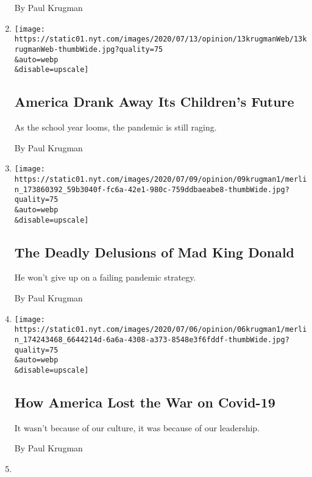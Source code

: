 \begin{enumerate}
  By Paul Krugman
\item
  \href{/2020/07/13/opinion/coronavirus-schools-bars.html}{}

  \texttt{[image: https://static01.nyt.com/images/2020/07/13/opinion/13krugmanWeb/13krugmanWeb-thumbWide.jpg?quality=75\\\&auto=webp\\\&disable=upscale]}

  \hypertarget{america-drank-away-its-childrens-future}{%
  \subsection{America Drank Away Its Children's
  Future}\label{america-drank-away-its-childrens-future}}

  As the school year looms, the pandemic is still raging.

  By Paul Krugman
\item
  \href{/2020/07/09/opinion/trump-coronavirus.html}{}

  \texttt{[image: https://static01.nyt.com/images/2020/07/09/opinion/09krugman1/merlin\_173860392\_59b3040f-fc6a-42e1-980c-759ddbaeabe8-thumbWide.jpg?quality=75\\\&auto=webp\\\&disable=upscale]}

  \hypertarget{the-deadly-delusions-of-mad-king-donald}{%
  \subsection{The Deadly Delusions of Mad King
  Donald}\label{the-deadly-delusions-of-mad-king-donald}}

  He won't give up on a failing pandemic strategy.

  By Paul Krugman
\item
  \href{/2020/07/06/opinion/covid-19-trump.html}{}

  \texttt{[image: https://static01.nyt.com/images/2020/07/06/opinion/06krugman1/merlin\_174243468\_6644214d-6a6a-4308-a373-8548e3f6fddf-thumbWide.jpg?quality=75\\\&auto=webp\\\&disable=upscale]}

  \hypertarget{how-america-lost-the-war-on-covid-19}{%
  \subsection{How America Lost the War on
  Covid-19}\label{how-america-lost-the-war-on-covid-19}}

  It wasn't because of our culture, it was because of our leadership.

  By Paul Krugman
\item
  \href{/2020/07/02/opinion/trump-covid-economy.html}{}


\end{enumerate}
